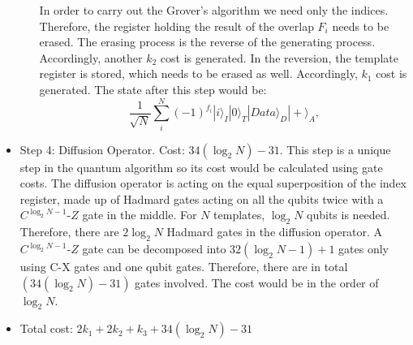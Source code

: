\documentclass[aps,prd,nofootinbib,twocolumn,reprint,superscriptaddress,showpacs,showkeys,longbibliography]{revtex4-1}
\newcommand{\ket}[1]{|#1\rangle}
\begin{document}
\begin{itemize}
\begin{itemize}
            \newline In order to carry out the Grover's algorithm we need only the indices. Therefore, the register holding the result of the overlap $F_i$ needs to be erased. The erasing process is the reverse of the generating process. Accordingly, another $k_2$ cost is generated. In the reversion, the template register is stored, which needs to be erased as well. Accordingly, $k_1$ cost is generated. The state after this step would be: 
            \begin{equation}
            \label{step3}
            \frac{1}{\sqrt{N}}\sum^N_i(-1)^{f_i}\ket{i}_I\ket{0}_T\ket{Data}_D\ket{+}_A,
            \end{equation}
        \end{itemize}
   \item  Step 4: Diffusion Operator. Cost: $34(\log_2 N)-31$. 
        \newline This step is a unique step in the quantum algorithm so its cost would be calculated using gate costs. The diffusion operator is acting on the equal superposition of the index register, made up of Hadmard gates acting on all the qubits twice with a $C^{\log_2 N-1}$-$Z$ gate in the middle. For $N$ templates, $\log_2 N$ qubits is needed. Therefore, there are $2\log_2 N$ Hadmard gates in the diffusion operator. A $C^{\log_2 N-1}$-$Z$ gate can be decomposed into $32(\log_2 N-1)+1$ gates only using C-X gates and one qubit gates. Therefore, there are in total $(34(\log_2 N)-31)$ gates involved. The cost would be in the order of $\log_2 N$. 
    \item Total cost: $2k_1+2k_2+k_3+34(\log_2 N)-31$
\end{itemize}
\end{document}
